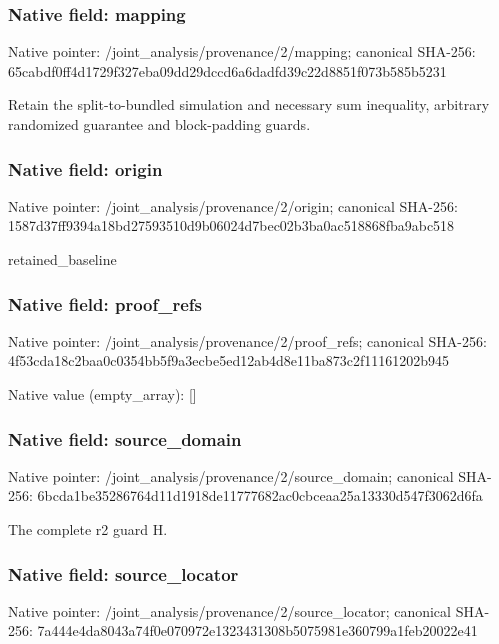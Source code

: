\documentclass[10pt,a4paper]{article}
\begin{document}
\subsubsection{Native field: mapping}
Native pointer: /joint\_\allowbreak{}analysis/provenance/2/mapping; canonical SHA-256: 65cabdf0ff4d1729f327eba09dd29dccd6a6dadfd39c22d8851f073b585b5231

\begingroup\raggedright\sloppy Retain the split-to-bundled simulation and necessary sum inequality,\allowbreak{} arbitrary randomized guarantee and block-padding guards.\par\endgroup

\subsubsection{Native field: origin}
Native pointer: /joint\_\allowbreak{}analysis/provenance/2/origin; canonical SHA-256: 1587d37ff9394a18bd27593510d9b06024d7bec02b3ba0ac518868fba9abc518

\begingroup\raggedright\sloppy retained\_\allowbreak{}baseline\par\endgroup

\subsubsection{Native field: proof\_\allowbreak{}refs}
Native pointer: /joint\_\allowbreak{}analysis/provenance/2/proof\_\allowbreak{}refs; canonical SHA-256: 4f53cda18c2baa0c0354bb5f9a3ecbe5ed12ab4d8e11ba873c2f11161202b945

Native value (empty\_\allowbreak{}array): []

\subsubsection{Native field: source\_\allowbreak{}domain}
Native pointer: /joint\_\allowbreak{}analysis/provenance/2/source\_\allowbreak{}domain; canonical SHA-256: 6bcda1be35286764d11d1918de11777682ac0cbceaa25a13330d547f3062d6fa

\begingroup\raggedright\sloppy The complete r2 guard H.\par\endgroup

\subsubsection{Native field: source\_\allowbreak{}locator}
Native pointer: /joint\_\allowbreak{}analysis/provenance/2/source\_\allowbreak{}locator; canonical SHA-256: 7a444e4da8043a74f0e070972e1323431308b5075981e360799a1feb20022e41
\end{document}
